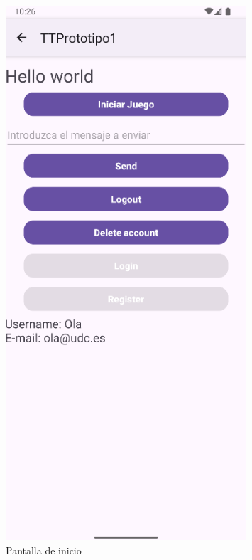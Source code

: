 \documentclass[a4paper,openright,12pt]{article}
\begin{document}
\begin{figure}[htp]
    \centering
    \begin{minipage}{0.3\textwidth}
        \centering
        \includegraphics[width=0.8\textwidth]{Images/Vista_It2.png} 
        \caption{Pantalla de inicio}
        \label{fig:Pantalla de inicio}
    \end{minipage}
    \hfill
    \begin{minipage}{0.3\textwidth}
        \centering

\end{minipage}
\end{figure}
\end{document}
